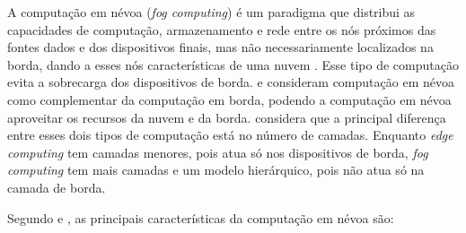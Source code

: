 A computação em névoa (\emph{fog computing}) é um paradigma que distribui
as capacidades de computação, armazenamento e rede entre os nós próximos
das fontes dados
e dos dispositivos finais, mas não necessariamente localizados na borda,
dando a esses nós características de uma nuvem
\cite{Bonomi2012,Dastjerdi2016,IEEECommunicationsSociety2018}.
Esse tipo de computação evita a sobrecarga dos dispositivos de borda.
 e
 consideram computação em névoa como complementar da
computação em borda, podendo a computação em névoa aproveitar os recursos da
nuvem e da borda.
 considera que a
principal diferença entre esses dois tipos de computação está no número de
camadas.
Enquanto \emph{edge computing} tem
camadas menores, pois atua só nos
dispositivos de borda, \emph{fog computing} tem mais camadas e um modelo
hierárquico, pois não atua só na camada de borda.

Segundo  e , as principais
características da computação em névoa são:

